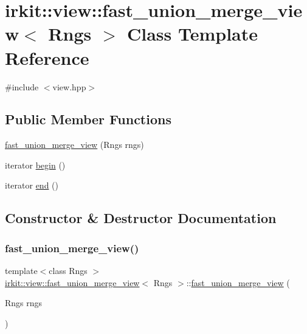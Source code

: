 \hypertarget{classirkit_1_1view_1_1fast__union__merge__view}{}\section{irkit\+:\+:view\+:\+:fast\+\_\+union\+\_\+merge\+\_\+view$<$ Rngs $>$ Class Template Reference}
\label{classirkit_1_1view_1_1fast__union__merge__view}


{\ttfamily \#include $<$view.\+hpp$>$}

\subsection*{Public Member Functions}
\begin{DoxyCompactItemize}
\item 
\hyperlink{classirkit_1_1view_1_1fast__union__merge__view_a2231c301a5a2bfebfc34996fc18cbae3}{fast\+\_\+union\+\_\+merge\+\_\+view} (Rngs rngs)
\item 
iterator \hyperlink{classirkit_1_1view_1_1fast__union__merge__view_ae204e072ecbd702c09c7813e05828138}{begin} ()
\item 
iterator \hyperlink{classirkit_1_1view_1_1fast__union__merge__view_aeabbfef53da70d55173f57ca04dd1070}{end} ()
\end{DoxyCompactItemize}


\subsection{Constructor \& Destructor Documentation}
\mbox{\label{classirkit_1_1view_1_1fast__union__merge__view_a2231c301a5a2bfebfc34996fc18cbae3}} 
\subsubsection{\texorpdfstring{fast\+\_\+union\+\_\+merge\+\_\+view()}{fast\_union\_merge\_view()}}
{\footnotesize\ttfamily template$<$class Rngs $>$ \\
\hyperlink{classirkit_1_1view_1_1fast__union__merge__view}{irkit\+::view\+::fast\+\_\+union\+\_\+merge\+\_\+view}$<$ Rngs $>$\+::\hyperlink{classirkit_1_1view_1_1fast__union__merge__view}{fast\+\_\+union\+\_\+merge\+\_\+view} (\begin{DoxyParamCaption}\item[{Rngs}]{rngs }\end{DoxyParamCaption})\hspace{0.3cm}{\ttfamily [inline]}}



